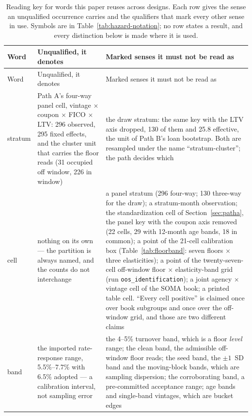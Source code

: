 \documentclass[12pt]{article}
\begin{document}
\begin{table}[H]
\begin{threeparttable}
\begin{tablenotes}[flushleft]
\end{tablenotes}
\end{threeparttable}
\end{table}

{\footnotesize
\begin{longtable}{@{}p{1.5cm}p{6.2cm}p{6.2cm}@{}}
\caption{Reading key for words this paper reuses across designs. Each row gives the sense an unqualified occurrence carries and the qualifiers that mark every other sense in use. Symbols are in Table~\ref{tab:hazard-notation}; no row states a result, and every distinction below is made where it is used.}
\label{tab:terminology}\\
\toprule
Word & Unqualified, it denotes & Marked senses it must not be read as \\
\midrule
\endfirsthead
\toprule
Word & Unqualified, it denotes & Marked senses it must not be read as \\
\midrule
\endhead
stratum & Path A's four-way panel cell, vintage $\times$ coupon $\times$ FICO $\times$ LTV: 296 observed, 295 fixed effects, and the cluster unit that carries the floor reads (31 occupied off window, 226 in window) & the draw stratum: the same key with the LTV axis dropped, 130 of them and 25.8 effective, the unit of Path B's loan bootstrap. Both are resampled under the name ``stratum-cluster''; the path decides which \\
cell & nothing on its own --- the partition is always named, and the counts do not interchange & a panel stratum (296 four-way; 130 three-way for the draw); a stratum-month observation; the standardization cell of Section~\ref{sec:patha}, the panel key with the coupon axis removed (22 cells, 29 with 12-month age bands, 18 in common); a point of the 21-cell calibration box (Table~\ref{tab:floorband}: seven floors $\times$ three elasticities); a point of the twenty-seven-cell off-window floor $\times$ elasticity-band grid (run \texttt{oos\_identification}); a joint agency $\times$ vintage cell of the SOMA book; a printed table cell. ``Every cell positive'' is claimed once over book subgroups and once over the off-window grid, and those are two different claims \\
band & the imported rate-response range, 5.5\%--7.7\% with 6.5\% adopted --- a calibration interval, not sampling error & the 4--5\% turnover band, which is a floor \emph{level} range; the clean band, the admissible off-window floor reads; the seed band, the $\pm 1$~SD band and the moving-block bands, which are sampling dispersion; the corroborating band, a pre-committed acceptance range; age bands and single-band vintages, which are bucket edges \\

\end{longtable}}
\end{document}
